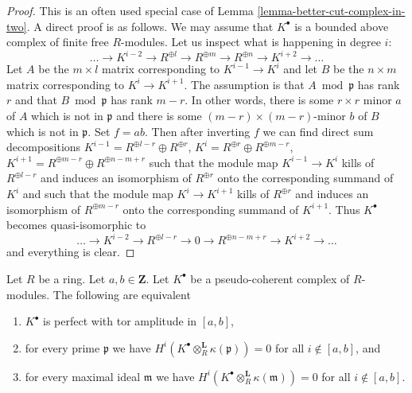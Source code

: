 \begin{proof}
This is an often used special case of
Lemma \ref{lemma-better-cut-complex-in-two}.
A direct proof is as follows.
We may assume that $K^\bullet$ is a bounded above
complex of finite free $R$-modules. Let us inspect what is happening
in degree $i$:
$$
\ldots \to K^{i - 2} \to R^{\oplus l}
\to R^{\oplus m} \to R^{\oplus n} \to K^{i + 2} \to \ldots
$$
Let $A$ be the $m \times l$ matrix corresponding to $K^{i - 1} \to K^i$
and let $B$ be the $n \times m$ matrix corresponding to $K^i \to K^{i + 1}$.
The assumption is that $A \bmod \mathfrak p$ has rank $r$ and that
$B \bmod \mathfrak p$ has rank $m - r$. In other words, there is some
$r \times r$ minor $a$ of $A$ which is not in $\mathfrak p$ and there is
some $(m - r) \times (m - r)$-minor $b$ of $B$ which is not in $\mathfrak p$.
Set $f = ab$. Then after inverting $f$ we can find direct sum decompositions
$K^{i - 1} = R^{\oplus l - r} \oplus R^{\oplus r}$,
$K^i = R^{\oplus r} \oplus R^{\oplus m - r}$,
$K^{i + 1} = R^{\oplus m - r} \oplus R^{\oplus n - m + r}$
such that the module map $K^{i - 1} \to K^i$ kills of
$R^{\oplus l - r}$ and induces an isomorphism of $R^{\oplus r}$ onto the
corresponding summand of $K^i$ and such that the module map $K^i \to K^{i + 1}$
kills of $R^{\oplus r}$ and induces an isomorphism of $R^{\oplus m - r}$
onto the corresponding summand of $K^{i + 1}$. Thus $K^\bullet$ becomes
quasi-isomorphic to
$$
\ldots \to K^{i - 2} \to R^{\oplus l - r}
\to 0 \to R^{\oplus n - m + r} \to K^{i + 2} \to \ldots
$$
and everything is clear.
\end{proof}

\begin{lemma}
\label{lemma-check-perfect-pointwise}
Let $R$ be a ring. Let $a, b \in \mathbf{Z}$.
Let $K^\bullet$ be a pseudo-coherent complex of $R$-modules.
The following are equivalent
\begin{enumerate}
\item $K^\bullet$ is perfect with tor amplitude in $[a, b]$,
\item for every prime $\mathfrak p$ we have
$H^i(K^\bullet \otimes_R^{\mathbf{L}} \kappa(\mathfrak p)) = 0$ for all
$i \not \in [a, b]$, and
\item for every maximal ideal $\mathfrak m$ we have
$H^i(K^\bullet \otimes_R^{\mathbf{L}} \kappa(\mathfrak m)) = 0$ for all
$i \not \in [a, b]$.
\end{enumerate}
\end{lemma}


